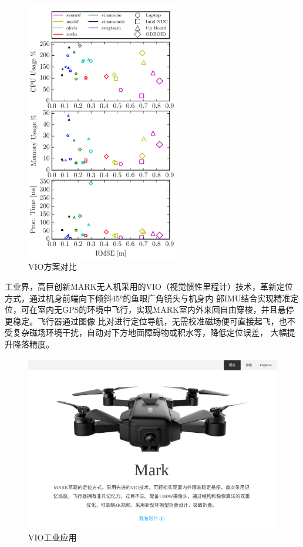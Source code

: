 \documentclass[UTF8]{ctexart}
\begin{document}
\begin{figure}[h]
\centering
\includegraphics[width=0.6\textwidth]{4.png}    
\caption{VIO方案对比}
\label{img0}
\end{figure}
\indent 工业界，高巨创新MARK无人机采用的VIO（视觉惯性里程计）技术，革新定位方式，通过机身前端向下倾斜45°的鱼眼广角镜头与机身内
部IMU结合实现精准定位，可在室内无GPS的环境中飞行，实现MARK室内外来回自由穿梭，并且悬停更稳定。飞行器通过图像
比对进行定位导航，无需校准磁场便可直接起飞，也不受复杂磁场环境干扰，自动对下方地面障碍物或积水等，降低定位误差，
大幅提升降落精度。\\
\begin{figure}[H]
\centering
\includegraphics[width = .8\textwidth]{1.png}
\caption{VIO工业应用}
\end{figure}
\end{document}
